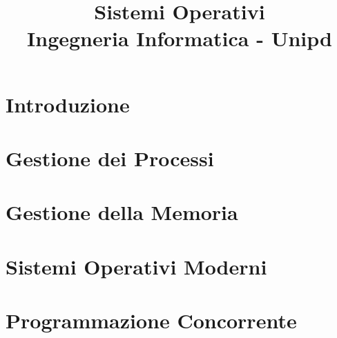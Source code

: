 \documentclass[a4paper,10pt]{report}
\title{\Huge \textbf{Sistemi Operativi}\\ \large Ingegneria Informatica - Unipd}
\date{}
\author{}
\begin{document}
\maketitle

\tableofcontents

\part{Introduzione}





\part{Gestione dei Processi}




\part{Gestione della Memoria}





\part{Sistemi Operativi Moderni}


\part{Programmazione Concorrente}

\end{document}
